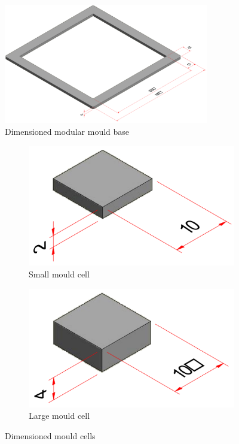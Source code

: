 \begin{figure}[H]
	\centering
	\includegraphics[width=0.8\textwidth]{MB.png}
	\caption{Dimensioned modular mould base}
	\label{fig:mb}
\end{figure}

\begin{figure}[H]
	\centering
	\begin{subfigure}[c]{0.3\textwidth}
		\centering
		\includegraphics[width=\textwidth]{MCS.png}
		\caption{Small mould cell}
	\end{subfigure}
	\hfill
	\begin{subfigure}[c]{0.3\textwidth}
		\centering
		\includegraphics[width=\textwidth]{MCL.png}
		\caption{Large mould cell}
	\end{subfigure}
	\caption{Dimensioned mould cells}
	\label{fig:mc}
\end{figure}

